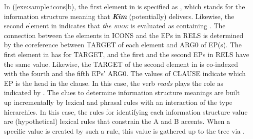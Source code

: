 

\noindent In (\ref{exe:sample:icons}b), the first element in  is
specified as , which stands for the information
structure meaning that \textit{\textbf{Kim}} (potentially)
delivers. Likewise, the second element in  indicates that
\textit{the \textsc{book}} is evaluated as containing
.  The connection between the elements in ICONS
and the EPs in RELS is determined by the coreference between TARGET of
each  element and ARG0 of EP(s). The first element in  has
 for TARGET, and the first and the second EPs in RELS
have the same value. Likewise, the TARGET of the second element in
 is co-indexed with the fourth and the fifth EPs' ARG0. The
values of CLAUSE indicate which EP is the head in the clause. In this
case, the verb \textit{reads} plays the role as indicated by
.  The clues to determine information structure
meanings are built up incrementally by lexical and phrasal rules with
an interaction of the type hierarchies. In this case, the rules for
identifying each information structure value are (hypothetical)
lexical rules that constrain the A and B accents.  When a specific
 value is created by such a rule, this value is gathered
up to the tree via  .


